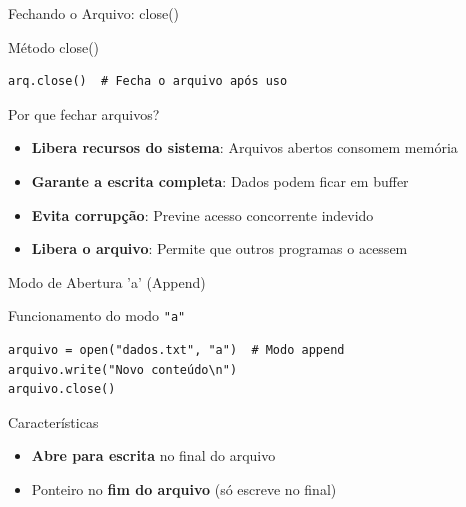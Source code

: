 \begin{frame}[fragile]{Fechando o Arquivo: close()}

    \begin{block}{Método close()}
        \begin{verbatim}
arq.close()  # Fecha o arquivo após uso
\end{verbatim}
    \end{block}

    \begin{alertblock}{Por que fechar arquivos?}
        \begin{itemize}
            \item \textbf{Libera recursos do sistema}: Arquivos abertos consomem memória
            \item \textbf{Garante a escrita completa}: Dados podem ficar em buffer
            \item \textbf{Evita corrupção}: Previne acesso concorrente indevido
            \item \textbf{Libera o arquivo}: Permite que outros programas o acessem
        \end{itemize}
    \end{alertblock}


\end{frame}


\begin{frame}[fragile]{Modo de Abertura 'a' (Append)}
    \begin{block}{Funcionamento do modo \texttt{"a"}}
        \begin{verbatim}
arquivo = open("dados.txt", "a")  # Modo append
arquivo.write("Novo conteúdo\n")
arquivo.close()
        \end{verbatim}
    \end{block}

    \begin{alertblock}{Características}
        \begin{itemize}
            \item \textbf{Abre para escrita} no final do arquivo

            \item Ponteiro no \textbf{fim do arquivo} (só escreve no final)
        \end{itemize}
    \end{alertblock}



\end{frame}


